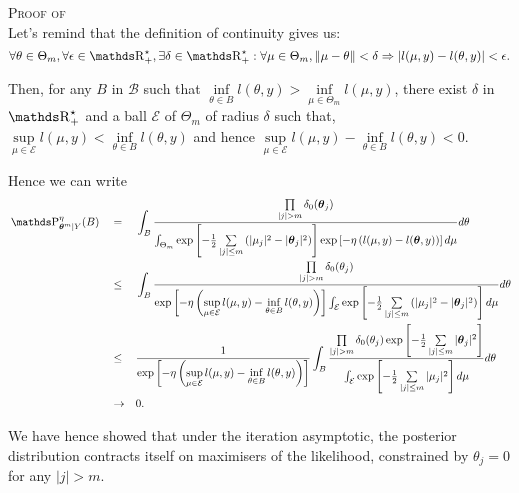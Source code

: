 \begin{pro}{\textsc{Proof of }\\}\label{pro2.1.1}
Let's remind that the definition of continuity gives us:
\[\forall \theta \in \Theta_{m}, \forall \epsilon \in \R_{+}^{\star}, \exists \delta \in \R_{+}^{\star} : \forall \mu \in \Theta_{m}, \Vert \mu - \theta \Vert < \delta \Rightarrow \vert l(\mu, y) - l(\theta, y) \vert < \epsilon.\]

\medskip

Then, for any $B$ in $\mathcal{B}$ such that $\inf\limits_{\theta \in B} l(\theta, y) > \inf\limits_{\mu \in \Theta_{m}} l(\mu, y)$, there exist $\delta$ in $\R_{+}^{\star}$ and a ball $\mathcal{E}$ of $\Theta_{m}$ of radius $\delta$ such that, $\sup\limits_{\mu \in \mathcal{E}} l(\mu, y) < \inf\limits_{\theta \in B}l(\theta, y)$ and hence $\sup\limits_{\mu \in \mathcal{E}}l(\mu, y) - \inf\limits_{\theta \in B}l(\theta, y) < 0$.

Hence we can write
\begin{alignat*}{3}
& \P_{\boldsymbol{\theta}^{m}\vert Y}^{\eta}(B) && = && \int_{B} \frac{\prod\limits_{\vert j \vert > m} \delta_{0}(\boldsymbol{\theta}_{j})}{\int_{\Theta_{m}} \exp\left[-\frac{1}{2}\sum\limits_{\vert j \vert \leq m} \left(\vert \mu_{j} \vert^{2} - \vert \boldsymbol{\theta}_{j} \vert^{2}\right)\right]\exp\left[-\eta\left(l(\mu, y) - l(\boldsymbol{\theta}, y)\right)\right] d\mu} d \theta\\
& && \leq && \int_{B} \frac{\prod\limits_{\vert j \vert > m} \delta_{0}(\theta_{j})}{\exp\left[-\eta\left(\sup\limits_{\mu \in \mathcal{E}} l(\mu, y) - \inf\limits_{\theta \in B}l(\theta, y)\right)\right] \int_{\mathcal{E}} \exp\left[-\frac{1}{2}\sum\limits_{\vert j \vert \leq m} \left(\vert \mu_{j} \vert^{2} - \vert \boldsymbol{\theta}_{j} \vert^{2}\right)\right]d\mu} d \theta\\
& && \leq && \frac{1}{\exp\left[-\eta\left(\sup\limits_{\mu \in \mathcal{E}} l(\mu, y) - \inf\limits_{\theta \in B}l(\theta, y)\right)\right]}\int_{B} \frac{\prod\limits_{\vert j \vert > m} \delta_{0}(\theta_{j}) \exp\left[-\frac{1}{2}\sum\limits_{\vert j \vert \leq m} \vert \boldsymbol{\theta}_{j} \vert^{2}\right]}{ \int_{\mathcal{E}} \exp\left[-\frac{1}{2}\sum\limits_{\vert j \vert \leq m} \vert \mu_{j} \vert^{2}\right]d\mu} d \theta\\
& && \rightarrow && 0.
\end{alignat*}
\qedsymbol
\end{pro}

We have hence showed that under the iteration asymptotic, the posterior distribution contracts itself on maximisers of the likelihood, constrained by $\theta_{j} = 0$ for any $\vert j \vert > m$.

